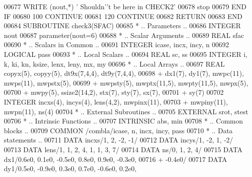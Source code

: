 \begin{DoxyCode}
00677                \textcolor{keyword}{WRITE} (nout,*) \textcolor{stringliteral}{' Shouldn'}\textcolor{stringliteral}{'t be here in CHECK2'}
00678                stop
00679 \textcolor{keywordflow}{            END IF}
00680   100    \textcolor{keywordflow}{CONTINUE}
00681   120 \textcolor{keywordflow}{CONTINUE}
00682       \textcolor{keywordflow}{RETURN}
00683 \textcolor{keyword}{      END}
00684 \textcolor{keyword}{      SUBROUTINE }check3(SFAC)
00685 \textcolor{comment}{*     .. Parameters ..}
00686       \textcolor{keywordtype}{INTEGER}           nout
00687       parameter(nout=6)
00688 \textcolor{comment}{*     .. Scalar Arguments ..}
00689       \textcolor{keywordtype}{REAL}              sfac
00690 \textcolor{comment}{*     .. Scalars in Common ..}
00691       \textcolor{keywordtype}{INTEGER}           icase, incx, incy, n
00692       \textcolor{keywordtype}{LOGICAL}           pass
00693 \textcolor{comment}{*     .. Local Scalars ..}
00694       \textcolor{keywordtype}{REAL}              sc, ss
00695       \textcolor{keywordtype}{INTEGER}           i, k, ki, kn, ksize, lenx, leny, mx, my
00696 \textcolor{comment}{*     .. Local Arrays ..}
00697       \textcolor{keywordtype}{REAL}              copyx(5), copyy(5), dt9x(7,4,4), dt9y(7,4,4),
00698      +                  dx1(7), dy1(7), mwpc(11), mwps(11), mwpstx(5),
00699      +                  mwpsty(5), mwptx(11,5), mwpty(11,5), mwpx(5),
00700      +                  mwpy(5), ssize2(14,2), stx(7), sty(7), sx(7),
00701      +                  sy(7)
00702       \textcolor{keywordtype}{INTEGER}           incxs(4), incys(4), lens(4,2), mwpinx(11),
00703      +                  mwpiny(11), mwpn(11), ns(4)
00704 \textcolor{comment}{*     .. External Subroutines ..}
00705       \textcolor{keywordtype}{EXTERNAL}          srot, stest
00706 \textcolor{comment}{*     .. Intrinsic Functions ..}
00707       \textcolor{keywordtype}{INTRINSIC}         abs, min
00708 \textcolor{comment}{*     .. Common blocks ..}
00709       \textcolor{keyword}{COMMON}            /combla/icase, n, incx, incy, pass
00710 \textcolor{comment}{*     .. Data statements ..}
00711       \textcolor{keyword}{DATA}              incxs/1, 2, -2, -1/
00712       \textcolor{keyword}{DATA}              incys/1, -2, 1, -2/
00713       \textcolor{keyword}{DATA}              lens/1, 1, 2, 4, 1, 1, 3, 7/
00714       \textcolor{keyword}{DATA}              ns/0, 1, 2, 4/
00715       \textcolor{keyword}{DATA}              dx1/0.6e0, 0.1e0, -0.5e0, 0.8e0, 0.9e0, -0.3e0,
00716      +                  -0.4e0/
00717       \textcolor{keyword}{DATA}              dy1/0.5e0, -0.9e0, 0.3e0, 0.7e0, -0.6e0, 0.2e0,

\end{DoxyCode}
